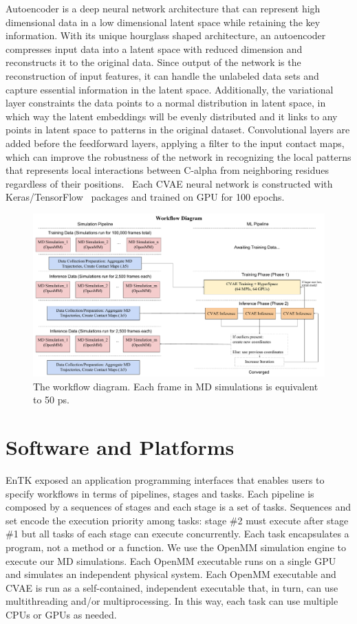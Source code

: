 \documentclass[conference,final]{IEEEtran}
\begin{document}
Autoencoder is a deep neural network architecture that can represent high
dimensional data in a low dimensional latent space while retaining the key
information. With its unique hourglass shaped architecture, an autoencoder
compresses input data into a latent space with reduced dimension and
reconstructs it to the original data. Since output of the network is the
reconstruction of input features, it can handle the unlabeled data sets and
capture essential information in the latent space. Additionally, the
variational layer constraints the data points to a normal distribution in
latent space, in which way the latent embeddings will be evenly distributed
and it links to any points in latent space to patterns in the original
dataset. Convolutional layers are added before the feedforward layers,
applying a filter to the input contact maps, which can improve the robustness
of the network in recognizing the local patterns that represents local
interactions between C-alpha from neighboring residues regardless of their
positions.~\cite{bhowmik2018deep}  Each CVAE neural network is constructed with Keras/TensorFlow~\cite{chollet2015keras,abadi2016tensorflow}
packages and trained on GPU for 100 epochs.


\begin{figure}
	\centering
	\includegraphics[width=.8\textwidth]{MicroScope_Workflow_Diagram}
	\caption{The workflow diagram. Each frame in MD simulations is equivalent to 50 ps. }
	\label{fig:microscopeworkflowdiagram}
\end{figure}
\section{Software and Platforms}

EnTK exposed an application programming interfaces that enables users to
specify workflows in terms of pipelines, stages and tasks. Each pipeline is
composed by a sequences of stages and each stage is a set of tasks. Sequences
and set encode the execution priority among tasks: stage \#2 must execute
after stage \#1 but all tasks of each stage can execute concurrently. Each
task encapsulates a program, not a method or a function. We use the OpenMM
simulation engine to execute our MD simulations. Each OpenMM executable runs
on a single GPU and simulates an independent physical system. Each OpenMM
executable and CVAE is run as a self-contained, independent executable that,
in turn, can use multithreading and/or multiprocessing. In this way, each
task can use multiple CPUs or GPUs as needed.
\end{document}
